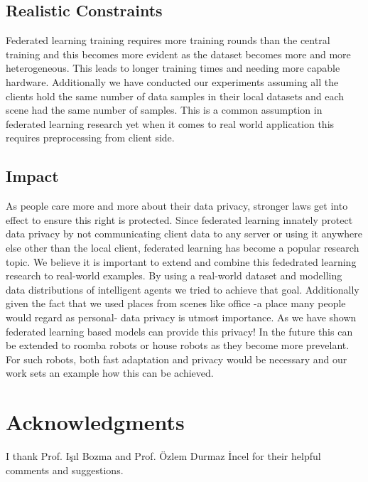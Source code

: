 \documentclass[11pt]{article}
\begin{document}
\subsection{Realistic Constraints}

\par Federated learning training requires more training rounds than the central training and this becomes more evident as the dataset becomes more and more heterogeneous. This leads to longer training times and needing more capable hardware. Additionally we have conducted our experiments assuming all the clients hold the same number of data samples in their local datasets and each scene had the same number of samples. This is a common assumption in federated learning research yet when it comes to real world application this requires preprocessing from client side. 

\subsection{Impact}

\par As people care more and more about their data privacy, stronger laws get into effect to ensure this right is protected. Since federated learning innately protect data privacy by not communicating client data to any server or using it anywhere else other than the local client, federated learning has become a popular research topic. We believe it is important to extend and combine this fededrated learning research to real-world examples. By using a real-world dataset and modelling data distributions of intelligent agents we tried to achieve that goal. Additionally given the fact that we used places from scenes like office -a place many people would regard as personal- data privacy is utmost importance. As we have shown federated learning based models can provide this privacy! In the future this can be extended to roomba robots or house robots as they become more prevelant. For such robots, both fast adaptation and privacy would be necessary and our work sets an example how this can be achieved.

\section{Acknowledgments}

\par I thank Prof. Işıl Bozma and Prof. Özlem Durmaz İncel for their helpful comments and suggestions.
\end{document}

